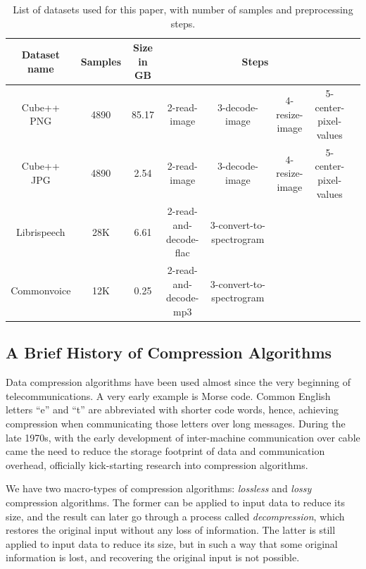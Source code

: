 \documentclass[sigconf,nonacm]{acmart}
\begin{document}
\begin{table}
  \centering
  \begin{tabular}{ |c|c|c|c|c|c|c|c| }
    \hline
    Dataset name                                & Samples & Size in GB & \multicolumn{4}{c|}{Steps}                                                                     \\
    \hline
    Cube++ PNG  \cite{ershov2020cube++}         & 4890    & 85.17      & 2-read-image               & 3-decode-image           & 4-resize-image & 5-center-pixel-values \\
    Cube++ JPG  \cite{ershov2020cube++}         & 4890    & 2.54       & 2-read-image               & 3-decode-image           & 4-resize-image & 5-center-pixel-values \\
    Librispeech \cite{panayotov2015librispeech} & 28K     & 6.61       & 2-read-and-decode-flac     & 3-convert-to-spectrogram &                &                       \\
    Commonvoice \cite{ardila2019commonvoice}    & 12K     & 0.25       & 2-read-and-decode-mp3      & 3-convert-to-spectrogram &                &                       \\
    \hline
  \end{tabular}
  \caption{List of datasets used for this paper, with number of samples and preprocessing steps.}
  \label{table:datasets}
\end{table}

\subsection{A Brief History of Compression Algorithms}
Data compression algorithms have been used almost since the very beginning of telecommunications. A very early example is Morse code.
Common English letters ``e'' and ``t'' are abbreviated with shorter code words, hence, achieving compression when communicating those letters over long messages.
During the late 1970s, with the early development of inter-machine communication over cable came the need to reduce the storage footprint of data and communication overhead, officially kick-starting research into compression algorithms.

We have two macro-types of compression algorithms: \textit{lossless} and \textit{lossy} compression algorithms.
The former can be applied to input data to reduce its size, and the result can later go through a process called \textit{decompression}, which restores the original input without any loss of information.
The latter is still applied to input data to reduce its size, but in such a way that some original information is lost, and recovering the original input is not possible.
\end{document}
